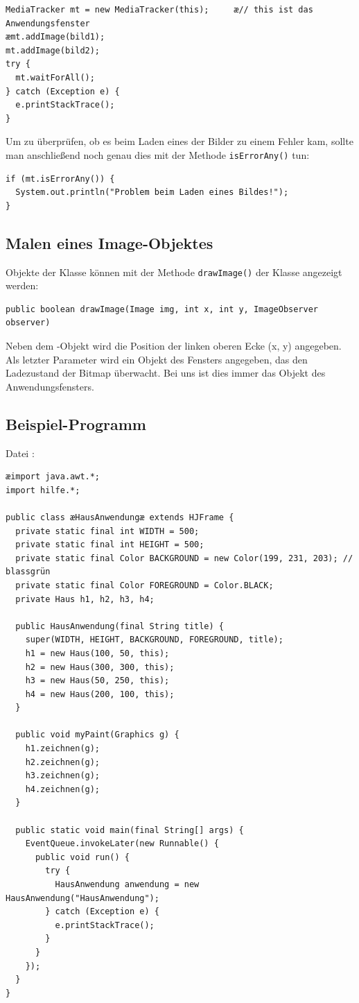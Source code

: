 \begin{lstlisting}
MediaTracker mt = new MediaTracker(this);     æ// this ist das Anwendungsfenster
æmt.addImage(bild1);
mt.addImage(bild2);
try {
  mt.waitForAll();
} catch (Exception e) {
  e.printStackTrace();
}
\end{lstlisting}

Um zu überprüfen, ob es beim Laden eines der Bilder zu einem Fehler kam, sollte
man anschließend noch genau dies mit der Methode \lstinline|isErrorAny()| tun:

\begin{lstlisting}
if (mt.isErrorAny()) {
  System.out.println("Problem beim Laden eines Bildes!");
}
\end{lstlisting}


\subsection{Malen eines Image-Objektes}

Objekte der Klasse  können mit der Methode
\lstinline|drawImage()| der Klasse  angezeigt werden:

\begin{lstlisting}
public boolean drawImage(Image img, int x, int y, ImageObserver observer)
\end{lstlisting}

Neben dem -Objekt wird die Position der linken oberen Ecke (x, y)
angegeben. Als letzter Parameter wird ein Objekt des Fensters angegeben, das
den Ladezustand der Bitmap überwacht. Bei uns ist dies immer das Objekt des
Anwendungsfensters.


\subsection{Beispiel-Programm}

Datei :

\begin{lstlisting}
æimport java.awt.*;
import hilfe.*;

public class æHausAnwendungæ extends HJFrame {
  private static final int WIDTH = 500;
  private static final int HEIGHT = 500;
  private static final Color BACKGROUND = new Color(199, 231, 203); // blassgrün
  private static final Color FOREGROUND = Color.BLACK;
  private Haus h1, h2, h3, h4;

  public HausAnwendung(final String title) {
    super(WIDTH, HEIGHT, BACKGROUND, FOREGROUND, title);
    h1 = new Haus(100, 50, this);
    h2 = new Haus(300, 300, this);
    h3 = new Haus(50, 250, this);
    h4 = new Haus(200, 100, this);
  }
  
  public void myPaint(Graphics g) {
    h1.zeichnen(g);
    h2.zeichnen(g);
    h3.zeichnen(g);
    h4.zeichnen(g);
  }

  public static void main(final String[] args) {
    EventQueue.invokeLater(new Runnable() {
      public void run() {
        try {
          HausAnwendung anwendung = new HausAnwendung("HausAnwendung");
        } catch (Exception e) {
          e.printStackTrace();
        }
      }
    });
  }
}
\end{lstlisting}

